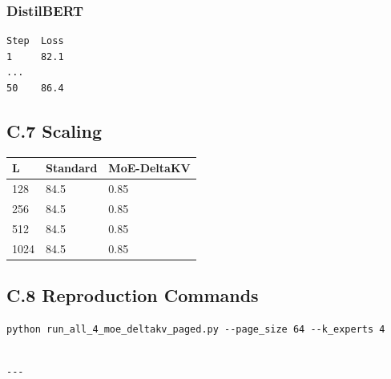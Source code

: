 \subsubsection{DistilBERT}
\begin{lstlisting}
Step  Loss
1     82.1
...
50    86.4
\end{lstlisting}

\subsection{C.7 Scaling}

\begin{table}[H]
\centering
\small
\begin{tabular}{lll}
\toprule
\textbf{L} & \textbf{Standard} & \textbf{MoE-DeltaKV} \\
\midrule
128 & 84.5 & 0.85 \\
256 & 84.5 & 0.85 \\
512 & 84.5 & 0.85 \\
1024 & 84.5 & 0.85 \\
\bottomrule
\end{tabular}
\end{table}

\subsection{C.8 Reproduction Commands}

\begin{lstlisting}
python run_all_4_moe_deltakv_paged.py --page_size 64 --k_experts 4
\end{lstlisting}
\begin{lstlisting}

---
\end{lstlisting}